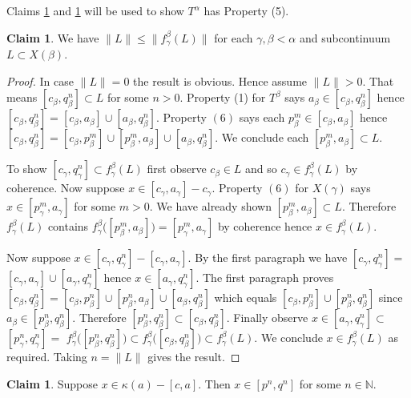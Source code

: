 \documentclass[12pt]{article}
\theoremstyle{plain}
\theoremstyle{definition}
\newcounter{ClaimCounter}
\newtheorem{claim}[ClaimCounter]{Claim}
\newcounter{claim5counter}
\newcommand{\A}{\ensuremath{\alpha}}
\newcommand{\K}{\ensuremath{\kappa}}
\newcommand{\B}{\ensuremath{\beta}}
\newcommand{\G}{\ensuremath{\gamma}}
\newcommand{\NN}{\ensuremath{\mathbb N}}
\newcommand{\0}{\ensuremath{\varnothing}}
\begin{document}
	
	Claims \ref{increasing} and \ref{longlim4} will be used to show $T^\A$ has Property (5).
	
	\begin{claim} \label{increasing}
		We have \mbox{$\|L\| \le \|f^\B_\G (L)\|$} for each $\G,\B < \A$ and subcontinuum \mbox{$L \subset X(\B)$}.
	\end{claim}
	
	\begin{proof}
		In case $\|L\|=0$ the result is obvious.
		Hence assume $\|L\| > 0$.
		That means $[c_\B,q^n_\B] \subset L$ for some $n >0$.
		Property (1) for $T^\B$ says $a_\B \in [c_\B,q^n_\B]$ hence $[c_\B,q^n_\B] = [c_\B,a_\B] \cup [a_\B, q^n_\B]$.
		Property $(6)$ says each $p^m_\B \in [c_\B,a_\B]$ 
		hence $[c_\B,q^n_\B] = [c_\B,p^m_\B] \cup [p^m_\B,a_\B] \cup [a_\B, q^n_\B]$.
		We conclude each $[p^m_\B,a_\B] \subset L$.
		
		To show $[c_\G,q^n_\G] \subset f^\B_\G(L)$ first observe $c_\B \in L$ and so $c_\G \in f^\B_\G(L)$ by coherence.
		Now suppose $x \in [c_\G,a_\G] - c_\G$.
		Property $(6)$ for $X(\G)$ says $x \in [p^m_\G,a_\G]$ for some $m>0$.
		We have already shown $[p^m_\B,a_\B] \subset L$. 
		Therefore $f^\B_\G(L)$ contains $f^\B_\G\big ( [p^m_\B,a_\B] \big ) = [p^m_\G,a_\G]$ by coherence hence $x \in f^\B_\G(L)$.
		
		Now suppose $x \in [c_\G,q^n_\G] -[c_\G,a_\G]$.
		By the first paragraph we have $[c_\G,q^n_\G] = $ $[c_\G,a_\G] \cup [a_\G, q^n_\G]$ hence $x \in [a_\G, q^n_\G]$.
		The first paragraph proves $[c_\B,q^n_\B] = [c_\B,p^n_\B] \cup [p^n_\B,a_\B] \cup [a_\B, q^n_\B]$
		which equals $[c_\B,p^n_\B] \cup [p^n_\B, q^n_\B]$ since $a_\B \in [p^n_\B,q^n_\B]$.
		Therefore $[p^n_\B,q^n_\B] \subset [c_\B,q^n_\B]$.
		Finally observe $x \in [a_\G, q^n_\G] \subset$ $ [p^n_\G,q^n_\G] = $ 
		$f^\B_\G\big ( [p^n_\B,q^n_\B] \big ) \subset f^\B_\G\big ( [c_\B,q^n_\B] \big ) \subset f^\B_\G(L)$. 
		We conclude $x \in f^\B_\G(L)$ as required.
		Taking $n = \|L\|$ gives the result.
	\end{proof}
	
	\begin{claim}\label{longlim4}
		Suppose $x \in \K(a)-[c,a]$.
		Then $x \in [p^n,q^n]$ for some $n \in \NN$.
	\end{claim}
	
\end{document}
